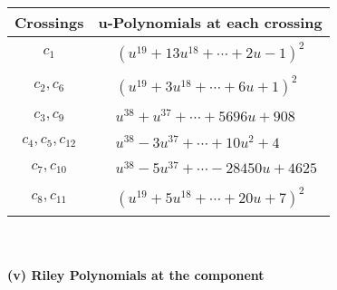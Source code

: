 \documentclass[1p]{elsarticle_modified}
\theoremstyle{definition}
\begin{document}
\begin{tabular}{m{50pt}|m{274pt}}
Crossings & \hspace{64pt}u-Polynomials at each crossing \\
\hline $$\begin{aligned}c_{1}\end{aligned}$$&$\begin{aligned}
&(u^{19}+13 u^{18}+\cdots+2 u-1)^{2}
\end{aligned}$\\
\hline $$\begin{aligned}c_{2},c_{6}\end{aligned}$$&$\begin{aligned}
&(u^{19}+3 u^{18}+\cdots+6 u+1)^{2}
\end{aligned}$\\
\hline $$\begin{aligned}c_{3},c_{9}\end{aligned}$$&$\begin{aligned}
&u^{38}+u^{37}+\cdots+5696 u+908
\end{aligned}$\\
\hline $$\begin{aligned}c_{4},c_{5},c_{12}\end{aligned}$$&$\begin{aligned}
&u^{38}-3 u^{37}+\cdots+10 u^2+4
\end{aligned}$\\
\hline $$\begin{aligned}c_{7},c_{10}\end{aligned}$$&$\begin{aligned}
&u^{38}-5 u^{37}+\cdots-28450 u+4625
\end{aligned}$\\
\hline $$\begin{aligned}c_{8},c_{11}\end{aligned}$$&$\begin{aligned}
&(u^{19}+5 u^{18}+\cdots+20 u+7)^{2}
\end{aligned}$\\
\hline
\end{tabular}\\~\\
\newpage\renewcommand{\arraystretch}{1}
\flushleft \textbf{(v) Riley Polynomials at the component}\newline \\
\end{document}
